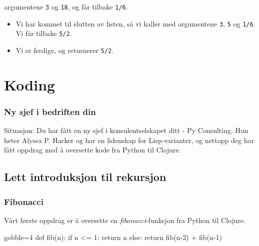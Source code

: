 \documentclass{beamer}
\begin{document}
\begin{frame}[fragile, t]
\begin{overprint}
\begin{itemize}
      argumentene {\tt 3} og {\tt 18}, og får tilbake {\tt 1/6}.
    \end{itemize}
    \begin{semiverbatim}
    \end{semiverbatim}
    \begin{itemize}
    \item<16-> Vi har kommet til slutten av listen, så vi kaller {\tt *} med
      argumentene {\tt 3}, {\tt 5} og {\tt 1/6}. Vi får tilbake {\tt 5/2}.
    \item<17-> Vi er ferdige, og returnerer {\tt 5/2}.
    \end{itemize}
  \end{overprint}

\end{frame}

\section{Koding}

\begin{frame}
  \frametitle{Ny sjef i bedriften din}

  Situasjon: Du har fått en ny sjef i konsulentselskapet ditt - Py
  Consulting. Hun heter Alyssa P. Hacker og har en lidenskap for Lisp-varianter,
  og nettopp deg har fått oppdrag med å oversette kode fra Python til Clojure.
\end{frame}

\subsection{Lett introduksjon til rekursjon}
\begin{frame}[fragile]
  \frametitle{Fibonacci}

  Vårt første oppdrag er å oversette en {\em fibonacci}-funksjon fra Python til
  Clojure.

  \vspace{3mm}
  \vspace{3mm}
  \begin{pycode*}{gobble=4}
    def fib(n):
        if n <= 1:
            return n
        else:
            return fib(n-2) + fib(n-1)
  \end{pycode*}
\end{frame}
\end{document}

